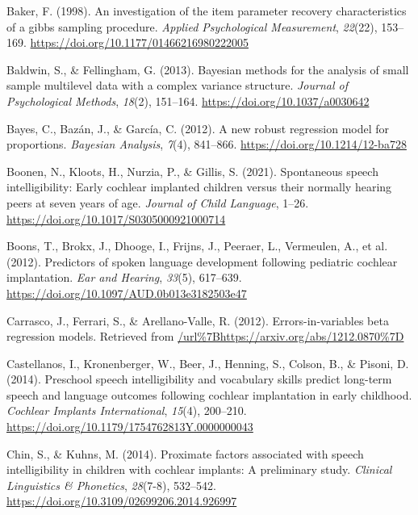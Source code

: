 \documentclass[
]{agujournal2019}
\newlength{\cslhangindent}
\newenvironment{CSLReferences}[2] %
 {\begin{list}{}{%
  \setlength{\itemindent}{0pt}
  \setlength{\leftmargin}{0pt}
  \setlength{\parsep}{0pt}
  \ifodd #1
   \setlength{\leftmargin}{\cslhangindent}
   \setlength{\itemindent}{-1\cslhangindent}
  \fi
  \setlength{\itemsep}{#2\baselineskip}}}
 {\end{list}}
\begin{document}
\label{refs}
\begin{CSLReferences}{1}{0}
\vspace{1em}

Baker, F. (1998). An investigation of the item parameter recovery
characteristics of a gibbs sampling procedure. \emph{Applied
Psychological Measurement}, \emph{22}(22), 153--169.
\url{https://doi.org/10.1177/01466216980222005}

Baldwin, S., \& Fellingham, G. (2013). Bayesian methods for the analysis
of small sample multilevel data with a complex variance structure.
\emph{Journal of Psychological Methods}, \emph{18}(2), 151--164.
\url{https://doi.org/10.1037/a0030642}

Bayes, C., Bazán, J., \& García, C. (2012). A new robust regression
model for proportions. \emph{Bayesian Analysis}, \emph{7}(4), 841--866.
\url{https://doi.org/10.1214/12-ba728}

Boonen, N., Kloots, H., Nurzia, P., \& Gillis, S. (2021). Spontaneous
speech intelligibility: Early cochlear implanted children versus their
normally hearing peers at seven years of age. \emph{Journal of Child
Language}, 1--26. \url{https://doi.org/10.1017/S0305000921000714}

Boons, T., Brokx, J., Dhooge, I., Frijns, J., Peeraer, L., Vermeulen,
A., et al. (2012). Predictors of spoken language development following
pediatric cochlear implantation. \emph{Ear and Hearing}, \emph{33}(5),
617--639. \url{https://doi.org/10.1097/AUD.0b013e3182503e47}

Carrasco, J., Ferrari, S., \& Arellano-Valle, R. (2012).
Errors-in-variables beta regression models. Retrieved from
\url{/url\%7Bhttps://arxiv.org/abs/1212.0870\%7D}

Castellanos, I., Kronenberger, W., Beer, J., Henning, S., Colson, B., \&
Pisoni, D. (2014). Preschool speech intelligibility and vocabulary
skills predict long-term speech and language outcomes following cochlear
implantation in early childhood. \emph{Cochlear Implants International},
\emph{15}(4), 200--210.
\url{https://doi.org/10.1179/1754762813Y.0000000043}

Chin, S., \& Kuhns, M. (2014). Proximate factors associated with speech
intelligibility in children with cochlear implants: A preliminary study.
\emph{Clinical Linguistics \& Phonetics}, \emph{28}(7-8), 532--542.
\url{https://doi.org/10.3109/02699206.2014.926997}


\end{CSLReferences}
\end{document}

